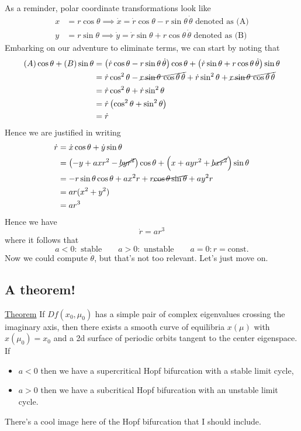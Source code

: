 \documentclass{article}
\begin{document}
As a reminder, polar coordinate transformations look like
\begin{align*}
    x &= r\cos\theta \implies \dot{x}=\dot{r}\cos\theta - r\sin\theta\,\dot{\theta} \text{ denoted as (A)} \\
    y &= r\sin\theta \implies \dot{y}=\dot{r}\sin\theta + r\cos\theta\,\dot{\theta} \text{ denoted as (B)}
\end{align*}
Embarking on our adventure to eliminate terms, we can start by noting that
\begin{align*}
    (A)\cos\theta + (B)\sin\theta &= \left(\dot{r}\cos\theta - r\sin\theta\,\dot{\theta}\right)\cos\theta + \left(\dot{r}\sin\theta + r\cos\theta\,\dot{\theta}\right)\sin\theta\\
    & = \dot{r}\cos^2\theta - \cancel{r\sin\theta\,\cos\theta\,\dot{\theta}} + \dot{r}\sin^2\theta + \cancel{r\sin\theta\,\cos\theta\,\dot{\theta}}\\
    &= \dot{r}\cos^2\theta+ \dot{r}\sin^2\theta\\
    &=\dot{r}\left( \cos^2\theta+ \sin^2\theta \right)\\
    &=\dot{r}
\end{align*}
Hence we are justified in writing
\begin{align*}
\dot{r} &= \dot{x}\cos\theta + \dot{y}\sin\theta \\
        &= \left(-y + axr^2 - \cancel{byr^2}\right)\cos\theta + \left(x + ayr^2 + \cancel{bxr^2}\right)\sin\theta \\
        &= -r\sin\theta\cos\theta + ax^2r + r\cancel{\cos\theta\sin\theta} + a y^2 r \\
        &= ar(x^2 + y^2) \\
        &= ar^3
\end{align*}
Hence we have
\[
\boxed{\dot{r} = ar^3}
\]
where it follows that
\[
a < 0: \text{ stable} \qquad a > 0: \text{ unstable} \qquad a = 0: r = \text{const.}
\]
Now we could compute $\dot{\theta}$, but that's not too relevant. Let's just move on.

\subsection{A theorem!}

\underline{Theorem} If $Df(x_0, \mu_0)$ has a simple pair of complex eigenvalues crossing the imaginary axis, then there exists a smooth curve of equilibria $x(\mu)$ with $x(\mu_0)=x_0$ and a 2d surface of periodic orbits tangent to the center eigenspace. If 
\begin{itemize}
    \item $a<0$ then we have a supercritical Hopf bifurcation with a stable limit cycle,
    \item $a>0$ then we have a subcritical Hopf bifurcation with an unstable limit cycle.
\end{itemize}
There's a cool image here of the Hopf bifurcation that I should include.
\end{document}
